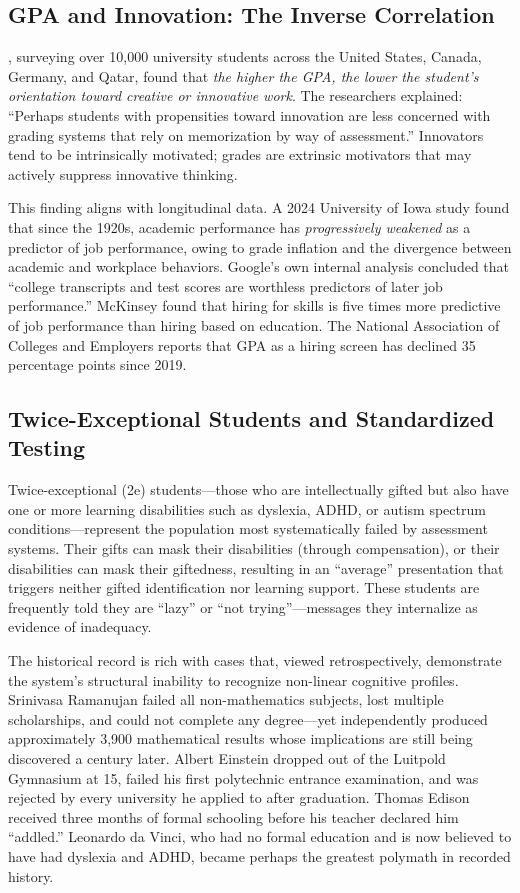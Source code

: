 \documentclass[12pt]{article}
\begin{document}
\subsection{GPA and Innovation: The Inverse Correlation}
\label{sec:gpa}

\citet{Mayhew2012innovation}, surveying over 10,000 university students across the United States, Canada, Germany, and Qatar, found that \emph{the higher the GPA, the lower the student's orientation toward creative or innovative work}. The researchers explained: ``Perhaps students with propensities toward innovation are less concerned with grading systems that rely on memorization by way of assessment.'' Innovators tend to be intrinsically motivated; grades are extrinsic motivators that may actively suppress innovative thinking.

This finding aligns with longitudinal data. A 2024 University of Iowa study found that since the 1920s, academic performance has \emph{progressively weakened} as a predictor of job performance, owing to grade inflation and the divergence between academic and workplace behaviors. Google's own internal analysis concluded that ``college transcripts and test scores are worthless predictors of later job performance.'' McKinsey found that hiring for skills is five times more predictive of job performance than hiring based on education. The National Association of Colleges and Employers reports that GPA as a hiring screen has declined 35 percentage points since 2019.

\subsection{Twice-Exceptional Students and Standardized Testing}
\label{sec:2e}

Twice-exceptional (2e) students---those who are intellectually gifted but also have one or more learning disabilities such as dyslexia, ADHD, or autism spectrum conditions---represent the population most systematically failed by assessment systems. Their gifts can mask their disabilities (through compensation), or their disabilities can mask their giftedness, resulting in an ``average'' presentation that triggers neither gifted identification nor learning support. These students are frequently told they are ``lazy'' or ``not trying''---messages they internalize as evidence of inadequacy.

The historical record is rich with cases that, viewed retrospectively, demonstrate the system's structural inability to recognize non-linear cognitive profiles. Srinivasa Ramanujan failed all non-mathematics subjects, lost multiple scholarships, and could not complete any degree---yet independently produced approximately 3,900 mathematical results whose implications are still being discovered a century later. Albert Einstein dropped out of the Luitpold Gymnasium at 15, failed his first polytechnic entrance examination, and was rejected by every university he applied to after graduation. Thomas Edison received three months of formal schooling before his teacher declared him ``addled.'' Leonardo da Vinci, who had no formal education and is now believed to have had dyslexia and ADHD, became perhaps the greatest polymath in recorded history.
\end{document}
